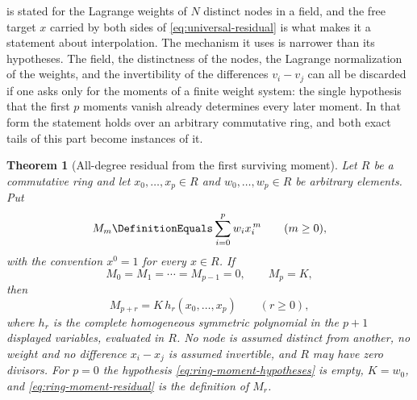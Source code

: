 \documentclass[11pt,a4paper,oneside,openany]{book}
\newtheorem{theorem}{Theorem}[chapter]
\theoremstyle{definition}
\theoremstyle{remark}
\begin{document}
 is stated for the Lagrange weights of $N$
distinct nodes in a field, and the free target $x$ carried by both sides of
\eqref{eq:universal-residual} is what makes it a statement about interpolation.
The mechanism it uses is narrower than its hypotheses.  The field, the
distinctness of the nodes, the Lagrange normalization of the weights, and the
invertibility of the differences $v_i-v_j$ can all be discarded if one asks only
for the moments of a finite weight system: the single hypothesis that the first
$p$ moments vanish already determines every later moment.  In that form the
statement holds over an arbitrary commutative ring, and both exact tails of this
part become instances of it.

\begin{theorem}[All-degree residual from the first surviving moment]
\label{thm:ring-moment-residual}
Let $R$ be a commutative ring and let $x_0,\ldots,x_p\in R$ and
$w_0,\ldots,w_p\in R$ be arbitrary elements.  Put
\begin{equation}\label{eq:ring-moment-definition}
 M_m\DefinitionEquals\sum_{i=0}^{p}w_ix_i^{\,m}
 \qquad(m\ge0),
\end{equation}
with the convention $x^0=1$ for every $x\in R$.  If
\begin{equation}\label{eq:ring-moment-hypotheses}
 M_0=M_1=\cdots=M_{p-1}=0,
 \qquad
 M_p=K,
\end{equation}
then
\begin{equation}\label{eq:ring-moment-residual}
 M_{p+r}=K\,h_r(x_0,\ldots,x_p)
 \qquad(r\ge0),
\end{equation}
where $h_r$ is the complete homogeneous symmetric polynomial in the $p+1$
displayed variables, evaluated in $R$.  No node is assumed distinct from another,
no weight and no difference $x_i-x_j$ is assumed invertible, and $R$ may have
zero divisors.  For $p=0$ the hypothesis \eqref{eq:ring-moment-hypotheses} is
empty, $K=w_0$, and \eqref{eq:ring-moment-residual} is the definition of $M_r$.
\end{theorem}
\end{document}
